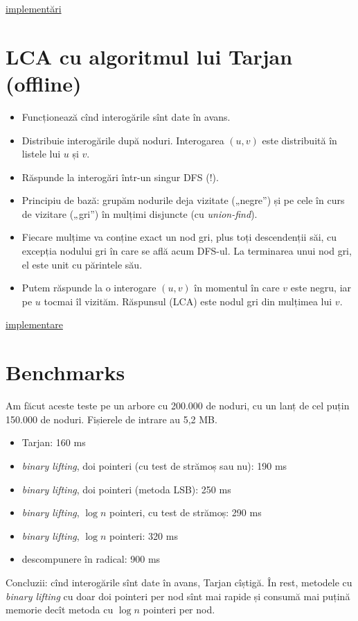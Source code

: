 \documentclass[../main.tex]{subfiles}
\begin{document}
\label{problem:tree-lca-two-pointers}
\hyperref[code:tree-lca-two-pointers]{implementări}

\section{LCA cu algoritmul lui Tarjan (offline)}

\begin{itemize}
  \item Funcționează cînd interogările sînt date în avans.

  \item Distribuie interogările după noduri. Interogarea $(u,v)$ este distribuită în listele lui $u$ și $v$.

  \item Răspunde la interogări într-un singur DFS (!).

  \item Principiu de bază: grupăm nodurile deja vizitate („negre”) și pe cele în curs de vizitare („gri”) în mulțimi disjuncte (cu \textit{union-find}).

  \item Fiecare mulțime va conține exact un nod gri, plus toți descendenții săi, cu excepția nodului gri în care se află acum DFS-ul. La terminarea unui nod gri, el este unit cu părintele său.

  \item Putem răspunde la o interogare $(u, v)$ în momentul în care $v$ este negru, iar pe $u$ tocmai îl vizităm. Răspunsul (LCA) este nodul gri din mulțimea lui $v$.
\end{itemize}

\label{problem:tree-lca-tarjan}
\hyperref[code:tree-lca-tarjan]{implementare}

\section{Benchmarks}

Am făcut aceste teste pe un arbore cu 200.000 de noduri, cu un lanț de cel puțin 150.000 de noduri. Fișierele de intrare au 5,2 MB.

\begin{itemize}
  \item Tarjan: 160 ms
  \item \textit{binary lifting}, doi pointeri (cu test de strămoș sau nu): 190 ms
  \item \textit{binary lifting}, doi pointeri (metoda LSB): 250 ms
  \item \textit{binary lifting}, $\log n$ pointeri, cu test de strămoș: 290 ms
  \item \textit{binary lifting}, $\log n$ pointeri: 320 ms
  \item descompunere în radical: 900 ms
\end{itemize}

Concluzii: cînd interogările sînt date în avans, Tarjan cîștigă. În rest, metodele cu \textit{binary lifting} cu doar doi pointeri per nod sînt mai rapide și consumă mai puțină memorie decît metoda cu $\log n$ pointeri per nod.
\end{document}
